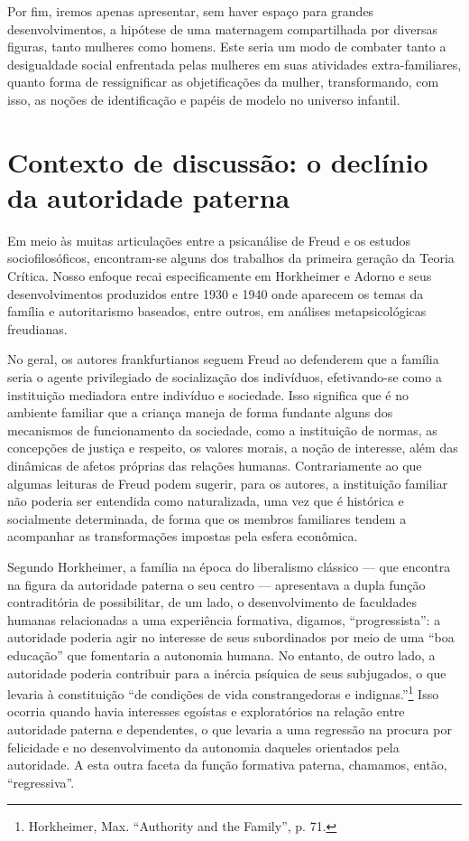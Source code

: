 Por fim, iremos apenas apresentar, sem haver espaço para grandes
desenvolvimentos, a hipótese de uma maternagem compartilhada por
diversas figuras, tanto mulheres como homens. Este seria um modo de
combater tanto a desigualdade social enfrentada pelas mulheres em suas
atividades extra-familiares, quanto forma de ressignificar as
objetificações da mulher, transformando, com isso, as noções de
identificação e papéis de modelo no universo infantil.

\section{Contexto de discussão: o declínio da autoridade paterna }

Em meio às muitas articulações entre a psicanálise de Freud e os estudos
sociofilosóficos, encontram-se alguns dos trabalhos da primeira geração
da Teoria Crítica. Nosso enfoque recai especificamente em Horkheimer e
Adorno e seus desenvolvimentos produzidos entre 1930 e 1940 onde
aparecem os temas da família e autoritarismo baseados, entre outros, em
análises metapsicológicas freudianas.

No geral, os autores frankfurtianos seguem Freud ao defenderem que a
família seria o agente privilegiado de socialização dos indivíduos,
efetivando-se como a instituição mediadora entre indivíduo e sociedade.
Isso significa que é no ambiente familiar que a criança maneja de forma
fundante alguns dos mecanismos de funcionamento da sociedade, como a
instituição de normas, as concepções de justiça e respeito, os valores
morais, a noção de interesse, além das dinâmicas de afetos próprias das
relações humanas. Contrariamente ao que algumas leituras de Freud podem
sugerir, para os autores, a instituição familiar não poderia ser
entendida como naturalizada, uma vez que é histórica e socialmente
determinada, de forma que os membros familiares tendem a acompanhar as
transformações impostas pela esfera econômica.

Segundo Horkheimer, a família na época do liberalismo clássico --- que
encontra na figura da autoridade paterna o seu centro --- apresentava a
dupla função contraditória de possibilitar, de um lado, o
desenvolvimento de faculdades humanas relacionadas a uma experiência
formativa, digamos, ``progressista'': a autoridade poderia agir no
interesse de seus subordinados por meio de uma ``boa educação'' que
fomentaria a autonomia humana. No entanto, de outro lado, a autoridade
poderia contribuir para a inércia psíquica de seus subjugados, o que
levaria à constituição ``de condições de vida constrangedoras e
indignas.''\footnote{Horkheimer, Max. ``Authority and the Family'', p.
  71.} Isso ocorria quando havia interesses egoístas e exploratórios na
relação entre autoridade paterna e dependentes, o que levaria a uma
regressão na procura por felicidade e no desenvolvimento da autonomia
daqueles orientados pela autoridade. A esta outra faceta da função
formativa paterna, chamamos, então, ``regressiva''.

